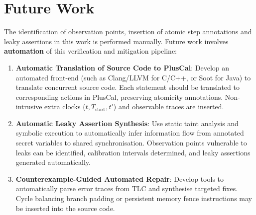 \documentclass[a4paper,12pt]{report}
\renewcommand{\bibname}{REFERENCES}
\begin{document}
\section{Future Work}
The identification of observation points, insertion of atomic step annotations and leaky assertions in this work is performed manually. Future work involves \textbf{automation} of this verification and mitigation pipeline:

\begin{enumerate}[label=\arabic*., itemsep=0.15em, topsep=0.1em]
    \item \textbf{Automatic Translation of Source Code to PlusCal}:
    Develop an automated front-end (such as Clang/LLVM for C/C++, or Soot for Java) to translate concurrent source code. Each statement should be translated to corresponding actions in PlusCal, preserving atomicity annotations. Non-intrusive extra clocks ($t, T_{\text{start}}, t'$) and observable traces are inserted.

    \item \textbf{Automatic Leaky Assertion Synthesis}:
    Use static taint analysis and symbolic execution to automatically infer information flow from annotated secret variables to shared synchronisation. Observation points vulnerable to leaks can be identified, calibration intervals determined, and leaky assertions generated automatically.

    \item \textbf{Counterexample-Guided Automated Repair}:
    Develop tools to automatically parse error traces from TLC and synthesise targeted fixes. Cycle balancing branch padding or persistent memory fence instructions may be inserted into the source code.
\end{enumerate}

\clearpage
{}
\renewcommand{\bibname}{REFERENCES}
\begingroup
\enlargethispage{2.5\baselineskip}
\makeatletter
\def\@makeschapterhead#1{%
  \vspace*{0.15cm}%
  {\parindent \z@ \raggedright
    \normalfont
    \interlinepenalty\@M
    {\fontsize{18}{22}\selectfont\bfseries #1\par\nobreak}
    \vskip 0.35cm
  }}
\makeatother
\end{document}
